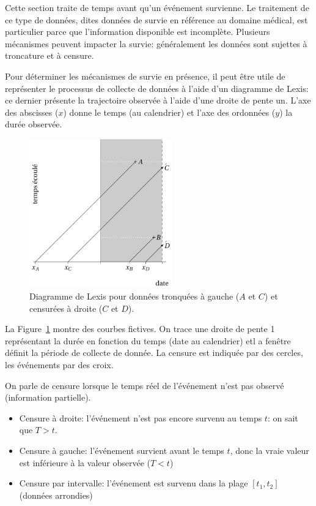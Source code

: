 \documentclass[
  11pt,
  letterpaper,
]{scrbook}
\providecommand{\tightlist}{%
  \setlength{\itemsep}{0pt}\setlength{\parskip}{0pt}}\usepackage{longtable,booktabs,array}
\theoremstyle{definition}
\theoremstyle{remark}
\begin{document}
Cette section traite de temps avant qu'un événement survienne. Le
traitement de ce type de données, dites données de survie en référence
au domaine médical, est particulier parce que l'information disponible
est incomplète. Plusieurs mécanismes peuvent impacter la survie:
généralement les données sont sujettes à troncature et à censure.

Pour déterminer les mécanismes de survie en présence, il peut être utile
de représenter le processus de collecte de données à l'aide d'un
diagramme de Lexis: ce dernier présente la trajectoire observée à l'aide
d'une droite de pente un. L'axe des abscisses (\(x\)) donne le temps (au
calendrier) et l'axe des ordonnées (\(y\)) la durée observée.

\begin{figure}[ht!]

{\centering \includegraphics[width=0.55\textwidth,height=\textheight]{./figures/Lexis_censure.png}

}

\caption{\label{fig-lexis}Diagramme de Lexis pour données tronquées à
gauche (\(A\) et \(C\)) et censurées à droite (\(C\) et \(D\)).}

\end{figure}

La Figure~\ref{fig-lexis} montre des courbes fictives. On trace une
droite de pente 1 représentant la durée en fonction du temps (date au
calendrier) etl a fenêtre définit la période de collecte de donnée. La
censure est indiquée par des cercles, les événements par des croix.

On parle de censure lorsque le temps réel de l'événement n'est pas
observé (information partielle).

\begin{itemize}
\tightlist
\item
  Censure à droite: l'événement n'est pas encore survenu au temps \(t\):
  on sait que \(T > t\).
\item
  Censure à gauche: l'événement survient avant le temps \(t\), donc la
  vraie valeur est inférieure à la valeur observée (\(T < t\))
\item
  Censure par intervalle: l'événement est survenu dans la plage
  \([t_1, t_2]\) (données arrondies)
\end{itemize}
\end{document}
